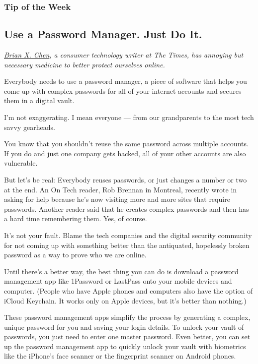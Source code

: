 \hypertarget{tip-of-the-week}{%
\subsubsection{Tip of the Week}\label{tip-of-the-week}}

\hypertarget{use-a-password-manager-just-do-it}{%
\subsection{Use a Password Manager. Just Do
It.}\label{use-a-password-manager-just-do-it}}

\href{https://www.nytimes.com/by/brian-x-chen}{\emph{Brian X.
Chen}}\emph{, a consumer technology writer at The Times, has annoying
but necessary medicine to better protect ourselves online.}

Everybody needs to use a password manager, a piece of software that
helps you come up with complex passwords for all of your internet
accounts and secures them in a digital vault.

I'm not exaggerating. I mean everyone --- from our grandparents to the
most tech savvy gearheads.

You know that you shouldn't reuse the same password across multiple
accounts. If you do and just one company gets hacked, all of your other
accounts are also vulnerable.

But let's be real: Everybody reuses passwords, or just changes a number
or two at the end. An On Tech reader, Rob Brennan in Montreal, recently
wrote in asking for help because he's now visiting more and more sites
that require passwords. Another reader said that he creates complex
passwords and then has a hard time remembering them. Yes, of course.

It's not your fault. Blame the tech companies and the digital security
community for not coming up with something better than the antiquated,
hopelessly broken password as a way to prove who we are online.

Until there's a better way, the best thing you can do is download a
password management app like 1Password or LastPass onto your mobile
devices and computer. (People who have Apple phones and computers also
have the option of iCloud Keychain. It works only on Apple devices, but
it's better than nothing.)

These password management apps simplify the process by generating a
complex, unique password for you and saving your login details. To
unlock your vault of passwords, you just need to enter one master
password. Even better, you can set up the password management app to
quickly unlock your vault with biometrics like the iPhone's face scanner
or the fingerprint scanner on Android phones.

